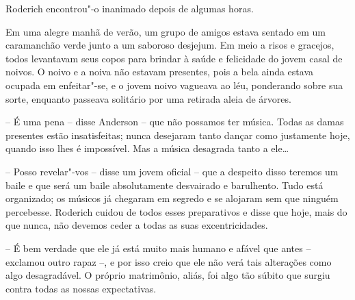 Roderich encontrou"-o inanimado depois de algumas horas.

\asterisc

Em uma alegre manhã de verão, um grupo de amigos estava sentado em um
caramanchão verde junto a um saboroso desjejum. Em meio a risos e
gracejos, todos levantavam seus copos para brindar à saúde e felicidade
do jovem casal de noivos. O noivo e a noiva não estavam presentes, pois
a bela ainda estava ocupada em enfeitar"-se, e o jovem noivo vagueava ao
léu, ponderando sobre sua sorte, enquanto passeava solitário por uma
retirada aleia de árvores.

-- É uma pena -- disse Anderson -- que não possamos ter música. Todas
as damas presentes estão insatisfeitas; nunca desejaram tanto dançar
como justamente hoje, quando isso lhes é impossível. Mas a música
desagrada tanto a ele\ldots{}

-- Posso revelar"-vos -- disse um jovem oficial -- que a despeito disso teremos
um baile e que será um baile absolutamente desvairado e barulhento.
Tudo está organizado; os músicos já chegaram em segredo e se alojaram
sem que ninguém percebesse. Roderich cuidou de todos esses preparativos
e disse que hoje, mais do que nunca, não devemos ceder a todas as suas
excentricidades.

-- É bem verdade que ele já está muito mais humano e afável que
antes -- exclamou outro rapaz --, e por isso creio que ele não verá tais
alterações como algo desagradável. O próprio matrimônio, aliás, foi
algo tão súbito que surgiu contra todas as nossas expectativas.

